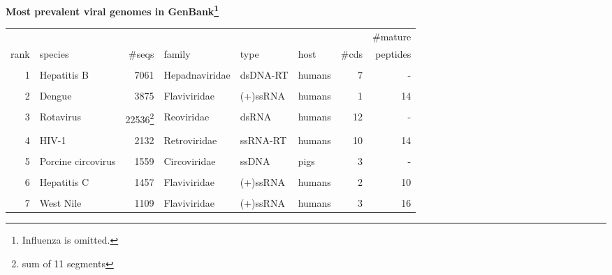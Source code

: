\documentclass[landscape]{slides}
\begin{document}
\begin{slide}
\begin{center}

\textbf{Most prevalent viral genomes in GenBank\footnote{Influenza is omitted.}}

\tiny
\begin{tabular}{r|l|r|l|l|l|r|r}
       &                    &              &                &          &        &       & \#mature \\ 
  rank & species            &       \#seqs & family         & type     & host   & \#cds & peptides \\ \hline
       &                    &              &                &          &        &       &          \\ 
     1 & Hepatitis B        &         7061 & Hepadnaviridae & dsDNA-RT & humans &     7 &       -  \\
       &                    &              &                &          &        &       &          \\ 
     2 & Dengue             &         3875 & Flaviviridae   & (+)ssRNA & humans &     1 &      14  \\
       &                    &              &                &          &        &       &          \\ 
     3 & Rotavirus          &      22536\footnote{sum of 11 segments}  & Reoviridae     & dsRNA    & humans &    12 &       -  \\
       &                    &              &                &          &        &       &          \\ 
     4 & HIV-1              &        2132  & Retroviridae   & ssRNA-RT & humans &    10 &      14  \\
       &                    &              &                &          &        &       &          \\ 
     5 & Porcine circovirus &        1559  & Circoviridae   & ssDNA    & pigs   &     3 &       -  \\
       &                    &              &                &          &        &       &          \\ 
     6 & Hepatitis C        &        1457  & Flaviviridae   & (+)ssRNA & humans &     2 &      10  \\
       &                    &              &                &          &        &       &          \\ 
     7 & West Nile          &        1109  & Flaviviridae   & (+)ssRNA & humans &     3 &      16  \\

\end{tabular}
\end{center}
\end{slide}
\end{document}
